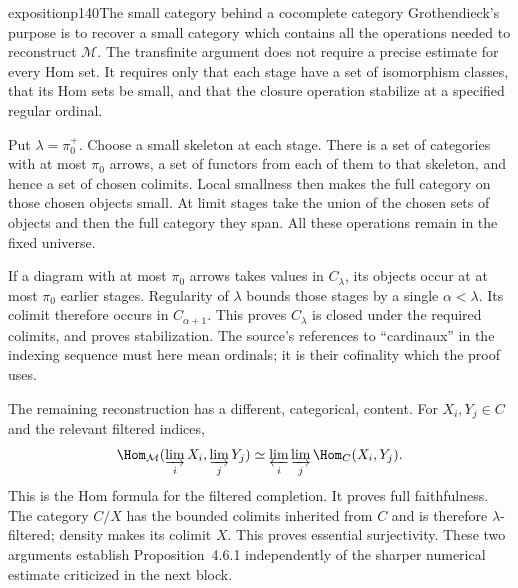 \begin{dcomment}{exposition}{p140}{The small category behind a cocomplete category}
Grothendieck's purpose is to recover a small category which contains all the operations needed to reconstruct $\mathcal M$. The transfinite argument does not require a precise estimate for every Hom set. It requires only that each stage have a set of isomorphism classes, that its Hom sets be small, and that the closure operation stabilize at a specified regular ordinal.

Put $\lambda=\pi_0^+$. Choose a small skeleton at each stage. There is a set of categories with at most $\pi_0$ arrows, a set of functors from each of them to that skeleton, and hence a set of chosen colimits. Local smallness then makes the full category on those chosen objects small. At limit stages take the union of the chosen sets of objects and then the full category they span. All these operations remain in the fixed universe.

If a diagram with at most $\pi_0$ arrows takes values in $C_\lambda$, its objects occur at at most $\pi_0$ earlier stages. Regularity of $\lambda$ bounds those stages by a single $\alpha<\lambda$. Its colimit therefore occurs in $C_{\alpha+1}$. This proves $C_\lambda$ is closed under the required colimits, and proves stabilization. The source's references to ``cardinaux'' in the indexing sequence must here mean ordinals; it is their cofinality which the proof uses.

The remaining reconstruction has a different, categorical, content. For $X_i,Y_j\in C$ and the relevant filtered indices,
\[
 \Hom_{\mathcal M}(\varinjlim_iX_i,\varinjlim_jY_j)
 \simeq\varprojlim_i\varinjlim_j\Hom_C(X_i,Y_j).
\]
This is the Hom formula for the filtered completion. It proves full faithfulness. The category $C/X$ has the bounded colimits inherited from $C$ and is therefore $\lambda$-filtered; density makes its colimit $X$. This proves essential surjectivity. These two arguments establish Proposition~4.6.1 independently of the sharper numerical estimate criticized in the next block.
\end{dcomment}

